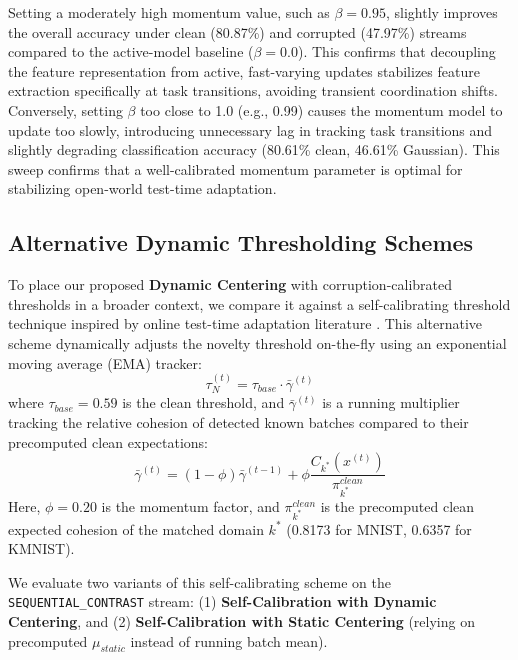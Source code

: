 \documentclass{article}
\theoremstyle{plain}
\theoremstyle{definition}
\theoremstyle{remark}
\begin{document}
Setting a moderately high momentum value, such as $\beta = 0.95$, slightly improves the overall accuracy under clean (80.87\%) and corrupted (47.97\%) streams compared to the active-model baseline ($\beta = 0.0$). This confirms that decoupling the feature representation from active, fast-varying updates stabilizes feature extraction specifically at task transitions, avoiding transient coordination shifts. Conversely, setting $\beta$ too close to 1.0 (e.g., 0.99) causes the momentum model to update too slowly, introducing unnecessary lag in tracking task transitions and slightly degrading classification accuracy (80.61\% clean, 46.61\% Gaussian). This sweep confirms that a well-calibrated momentum parameter is optimal for stabilizing open-world test-time adaptation.

\subsection{Alternative Dynamic Thresholding Schemes}
To place our proposed \textbf{Dynamic Centering} with corruption-calibrated thresholds in a broader context, we compare it against a self-calibrating threshold technique inspired by online test-time adaptation literature \cite{zhang2022memo}. This alternative scheme dynamically adjusts the novelty threshold on-the-fly using an exponential moving average (EMA) tracker:
\begin{equation}
    \tau_N^{(t)} = \tau_{base} \cdot \bar{\gamma}^{(t)}
\end{equation}
where $\tau_{base} = 0.59$ is the clean threshold, and $\bar{\gamma}^{(t)}$ is a running multiplier tracking the relative cohesion of detected known batches compared to their precomputed clean expectations:
\begin{equation}
    \bar{\gamma}^{(t)} = (1 - \phi) \bar{\gamma}^{(t-1)} + \phi \frac{C_{k^*}(x^{(t)})}{\pi^{clean}_{k^*}}
\end{equation}
Here, $\phi = 0.20$ is the momentum factor, and $\pi^{clean}_{k^*}$ is the precomputed clean expected cohesion of the matched domain $k^*$ (0.8173 for MNIST, 0.6357 for KMNIST).

We evaluate two variants of this self-calibrating scheme on the \texttt{SEQUENTIAL\_CONTRAST} stream: (1) \textbf{Self-Calibration with Dynamic Centering}, and (2) \textbf{Self-Calibration with Static Centering} (relying on precomputed $\mu_{static}$ instead of running batch mean).
\end{document}
